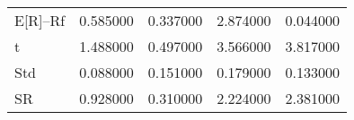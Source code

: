 \begin{tabular}{lrrrr}
\toprule
\midrule
E[R]--Rf & 0.585000 & 0.337000 & 2.874000 & 0.044000 \\
t & 1.488000 & 0.497000 & 3.566000 & 3.817000 \\
Std & 0.088000 & 0.151000 & 0.179000 & 0.133000 \\
SR & 0.928000 & 0.310000 & 2.224000 & 2.381000 \\
\bottomrule
\end{tabular}
